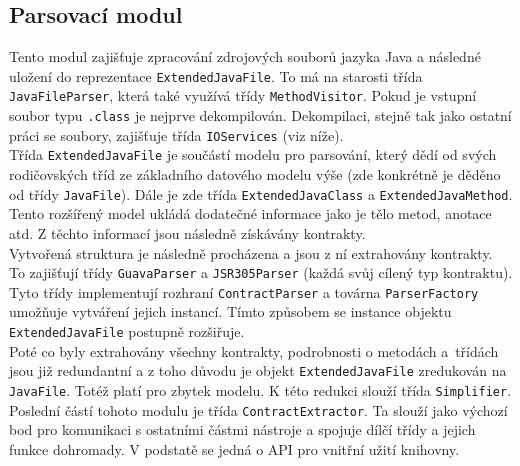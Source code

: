 				

		\subsection{Parsovací modul}
			Tento modul zajišťuje zpracování zdrojových souborů jazyka Java a následné uložení do reprezentace \texttt{ExtendedJavaFile}. To má na starosti třída \texttt{JavaFileParser}, která také využívá třídy \texttt{MethodVisitor}. Pokud je vstupní soubor typu \texttt{.class} je nejprve dekompilován. Dekompilaci, stejně tak jako ostatní práci se soubory, zajišťuje třída \texttt{IOServices} (viz níže).\\
			
			Třída \texttt{ExtendedJavaFile} je součástí modelu pro parsování, který dědí od svých rodičovských tříd ze základního datového modelu výše (zde konkrétně je děděno od třídy \texttt{JavaFile}). Dále je zde třída \texttt{ExtendedJavaClass} a \texttt{ExtendedJavaMethod}. Tento rozšířený model ukládá dodatečné informace jako je tělo metod, anotace atd. Z těchto informací jsou následně získávány kontrakty.\\
			
			Vytvořená struktura je následně procházena a jsou z ní extrahovány kontrakty. To zajišťují třídy \texttt{GuavaParser} a \texttt{JSR305Parser} (každá svůj cílený typ kontraktu). Tyto třídy implementují rozhraní \texttt{ContractParser} a továrna \texttt{ParserFactory} umožňuje vytváření jejich instancí. Tímto způsobem se instance objektu \texttt{ExtendedJavaFile} postupně rozšiřuje.\\
			
			Poté co byly extrahovány všechny kontrakty, podrobnosti o metodách a~třídách jsou již redundantní a z toho důvodu je objekt \texttt{ExtendedJavaFile} zredukován na \texttt{JavaFile}. Totéž platí pro zbytek modelu. K této redukci slouží třída \texttt{Simplifier}.\\
			
			Poslední částí tohoto modulu je třída \texttt{ContractExtractor}. Ta slouží jako výchozí bod pro komunikaci s ostatními částmi nástroje a spojuje dílčí třídy a jejich funkce dohromady. V podstatě se jedná o API pro vnitřní užití knihovny.\\
			
